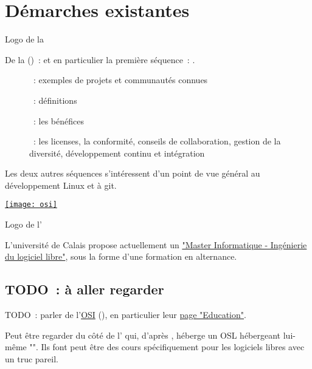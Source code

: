 \chapter{Démarches existantes}

\begin{marginfigure}
    \href{https://www.linuxfoundation.org/}{}
    \caption{Logo de la }
\end{marginfigure}

De la  () :
  \href{https://www.edx.org/professional-certificate/linuxfoundationx-open-source-software-development-linux-and-git}
  {}
et en particulier la première séquence :
  \href{https://www.edx.org/course/open-source-software-development-linux-for-developers}
  {}.

\begin{description}
    \item[] : exemples de projets et communautés connues
    \item[] : définitions
    \item[] : les bénéfices
    \item[] : les licenses, la conformité, conseils de collaboration, gestion de la
        diversité, développement continu et intégration
\end{description}

Les deux autres séquences s'intéressent d'un point de vue général au développement Linux et à git.

\begin{marginfigure}
    \href{https://opensource.org/}{\texttt{[image: osi]}}
    \caption{Logo de l'}
\end{marginfigure}

L'université de Calais propose actuellement un
\href{https://www.univ-littoral.fr/formation/offre-de-formation/masters/master-informatique-ingenierie-du-logiciel-libre/}{"Master
Informatique - Ingénierie du logiciel libre"}, sous la forme d'une formation en alternance.

\section{TODO : à aller regarder}

TODO : parler de l'\href{https://opensource.org/}{OSI} (), en particulier leur
\href{https://opensource.org/osi-open-source-education}{page "Education"}.

Peut être regarder du côté de l' qui, d'après \textcite{barriers-2018}, héberge un
\acrfull{OSL} hébergeant lui-même "". Ils
    font peut être des cours spécifiquement pour les logiciels libres avec un truc pareil.
